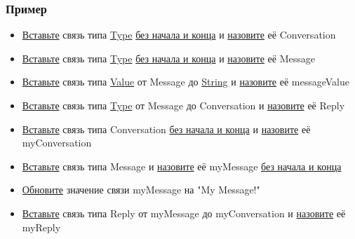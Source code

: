\subsubsection{Пример}
\begin{itemize}
      \item \hyperlink{DeepCase.InsertLink.Description}{Вставьте} связь типа
            \hyperlink{Core.Type.Description}{Type}
            \hyperlink{FAQ.HowToInsertLinkWithoutFromAndTo}{без
                  начала и конца} и \hyperlink{FAQ.HowToSetName}{назовите} её
            Conversation
      \item \hyperlink{DeepCase.InsertLink.Description}{Вставьте} связь типа
            \hyperlink{Core.Type.Description}{Type}
            \hyperlink{FAQ.HowToInsertLinkWithoutFromAndTo}{без
                  начала и конца} и
            \hyperlink{FAQ.HowToSetName}{назовите} её Message
      \item \hyperlink{DeepCase.InsertLink.Description}{Вставьте} связь типа
            \hyperlink{Core.Value.Description}{Value} от Message до
            \hyperlink{Core.String.Description}{String} и
            \hyperlink{FAQ.HowToSetName}{назовите} её messageValue
      \item \hyperlink{DeepCase.InsertLink.Description}{Вставьте} связь типа
            \hyperlink{Core.Type.Description}{Type} от Message до Conversation
            и
            \hyperlink{FAQ.HowToSetName}{назовите} её Reply
      \item \hyperlink{DeepCase.InsertLink.Description}{Вставьте} связь типа
            Conversation
            \hyperlink{FAQ.HowToInsertLinkWithoutFromAndTo}{без начала и конца} и
            \hyperlink{FAQ.HowToSetName}{назовите} её myConversation
      \item \hyperlink{DeepCase.InsertLink.Description}{Вставьте} связь типа
            Message и \hyperlink{FAQ.HowToSetName}{назовите} её myMessage
            \hyperlink{FAQ.HowToInsertLinkWithoutFromAndTo}{без начала и конца}
      \item \hyperlink{DeepCase.UpdateLink.Description}{Обновите} значение связи
            myMessage на "My Message!"
      \item \hyperlink{DeepCase.InsertLink.Description}{Вставьте} связь типа
            Reply от
            myMessage до myConversation и \hyperlink{FAQ.HowToSetName}{назовите} её
            myReply
\end{itemize}

